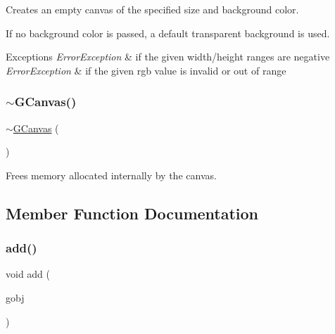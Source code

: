 Creates an empty canvas of the specified size and background color. 

If no background color is passed, a default transparent background is used. 
\begin{DoxyExceptions}{Exceptions}
{\em Error\+Exception} & if the given width/height ranges are negative \\
\hline
{\em Error\+Exception} & if the given rgb value is invalid or out of range \\
\hline
\end{DoxyExceptions}
\mbox{\label{classsgl_1_1GCanvas_af7574c14a3a729c56863e9c4ab6a6787}} 
\subsubsection{\texorpdfstring{$\sim$\+G\+Canvas()}{~GCanvas()}}
{\footnotesize\ttfamily $\sim$\mbox{\hyperlink{classsgl_1_1GCanvas}{G\+Canvas}} (\begin{DoxyParamCaption}{ }\end{DoxyParamCaption})\hspace{0.3cm}{\ttfamily [override]}}



Frees memory allocated internally by the canvas. 



\subsection{Member Function Documentation}
\mbox{\label{classsgl_1_1GCanvas_afe8277e7b2627513c6f7452fb0b2847d}} 
\subsubsection{\texorpdfstring{add()}{add()}\hspace{0.1cm}{\footnotesize\ttfamily [1/4]}}
{\footnotesize\ttfamily void add (\begin{DoxyParamCaption}\item[{\mbox{\hyperlink{classsgl_1_1GObject}{G\+Object}} $\ast$}]{gobj }\end{DoxyParamCaption})\hspace{0.3cm}{\ttfamily [virtual]}}



